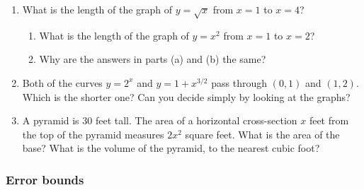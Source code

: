 \begin{enumerate}
\begin{enumerate}
  \item ${\displaystyle \int_0^4 \sin(x^2) \, dx}$


  \item ${\displaystyle \int_0^1 \dfrac{4}{1 + x^2} \, dx}$


\end{enumerate}
\item What is the length of the graph of $y = \sqrt{x}$ from $x = 1$
to $x = 4$?

  \begin{enumerate}
  \item What is the length of the graph of $y = x^2$ from $x = 1$ to $x =
2$?

  \item Why are the answers in parts (a) and (b) the same?



\end{enumerate}
\item Both of the curves $y = 2^x$ and $y = 1 + x^{3/2}$ pass through
$(0,1)$ and $(1,2)$.  Which is the shorter one?  Can you decide simply
by looking at the graphs?



\item A pyramid is 30 feet tall.  The area of a horizontal
cross-section $x$ feet from the top of the pyramid measures $2x^2$
square feet.  What is the area of the base?  What is the volume of the
pyramid, to the nearest cubic foot?


\end{enumerate}
\subsubsection{Error bounds}
\label{subsubsec:error-bounds}




